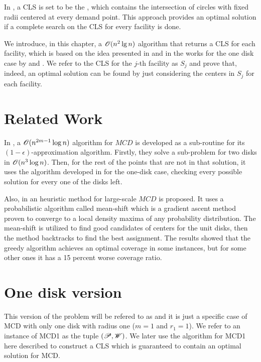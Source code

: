 In , a CLS is set to be the , which contains the intersection of circles with fixed radii centered at every demand point. This approach provides an optimal solution if a complete search on the CLS for every facility is done. 

We introduce, in this chapter, a $\mathscr{O}(n^2\lg{n})$ algorithm that returns a CLS for each facility, which is based on the idea presented in  and in the works for the one disk case by  and . We refer to the CLS for the $j$-th facility as $S_j$ and prove that, indeed, an optimal solution can be found by just considering the centers in $S_j$ for each facility.

\section{Related Work}
In , a $\mathscr{O}(n^{2m-1}\log{n})$ algorithm for $MCD$ is developed as a sub-routine for its $(1-\epsilon)$-approximation algorithm. Firstly, they solve a sub-problem for two disks in $\mathscr{O}(n^3\log{n})$. Then, for the rest of the points that are not in that solution, it uses the algorithm developed in  for the one-disk case, checking every possible solution for every one of the disks left.

Also, in  an heuristic method for large-scale $MCD$ is proposed. It uses a probabilistic algorithm called mean-shift which is a gradient ascent method proven to converge to a local density maxima of any probability distribution. The mean-shift is utilized to find good candidates of centers for the unit disks, then the method backtracks to find the best assignment. The results showed that the greedy algorithm achieves an optimal coverage in some instances, but for some other ones it has a 15 percent worse coverage ratio.

\section{One disk version}

This version of the problem will be refered to as  and it is just a specific case of MCD with only one disk with radius one ($m=1$ and $r_1=1$). We refer to an instance of MCD1 as the tuple $(\mathscr{P}, \mathscr{W})$.
We later use the algorithm for MCD1 here described to construct a CLS which is guaranteed to contain an optimal solution for MCD.


